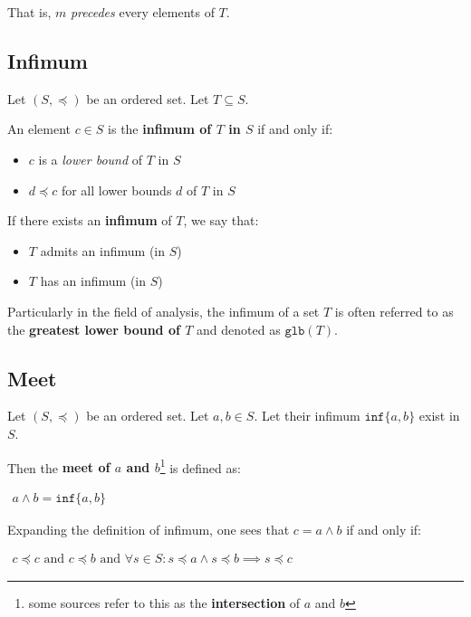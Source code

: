 That is, $m$ \textit{precedes} every elements of $T$.


\subsection{Infimum}
Let $(S, \preceq)$ be an ordered set. Let $T \subseteq S$.


An element $c \in S$ is the \textbf{infimum of $T$ in $S$} if and only
if:

\begin{itemize}
\item $c$ is a \textit{lower bound} of $T$ in $S$
\item $d \preceq c$ for all lower bounds $d$ of $T$ in $S$
\end{itemize}

If there exists an \textbf{infimum} of $T$, we say that:

\begin{itemize}
\item $T$ admits an infimum (in $S$)
\item $T$ has an infimum (in $S$)
\end{itemize}


Particularly in the field of analysis, the infimum of a set $T$ is
often referred to as the \textbf{greatest lower bound of $T$} and
denoted as $\mathtt{glb}(T)$.


\subsection{Meet}
Let $(S, \preceq)$ be an ordered set. Let $a, b \in S$. Let their
infimum $\mathtt{inf} \{a, b\}$ exist in $S$.

Then the \textbf{meet of $a$ and $b$}\footnote{some sources refer to
  this as the \textbf{intersection} of $a$ and $b$} is defined as:

\begin{math}
  \begin{array}{c}
    a \wedge b =\mathtt{inf} \{ a, b \}
  \end{array}
\end{math}


Expanding the definition of infimum, one sees that $c = a \wedge b$ if
and only if:

\begin{math}
  \begin{array}{c}
    c \preceq c\text{ and }c \preceq b\text{ and } \forall s \in S: s \preceq a \land s \preceq b \implies s \preceq c
  \end{array}
\end{math}


